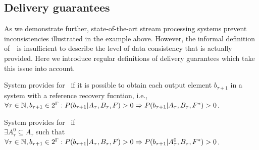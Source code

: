 

\subsection{Delivery guarantees}

As we demonstrate further, state-of-the-art stream processing systems prevent inconsistencies illustrated in the example above. However, the informal definition of~\eo\ is insufficient to describe the level of data consistency that is actually provided. Here we introduce regular definitions of delivery guarantees which take this issue into account. 

\begin{definition}{System provides for~\eo}
if it is possible to obtain each output element $b_{\tau+1}$ in a system with a reference recovery fucntion, i.e.,\\ 
$\forall{\tau \in \mathbb{N}}, b_{\tau+1}\in 2^{\Gamma}: P(b_{\tau+1}|A_{\tau},B_\tau,F)>0 \Rightarrow \\ P(b_{\tau+1}|A_{\tau},B_\tau,F^{*})>0$.
\end{definition}

\begin{definition}{System provides for~\amo}
if \\
$\exists{A^{0}_{\tau}\subseteq{A_{\tau}}}$ such that \\
$\forall{\tau \in \mathbb{N},{b_{\tau+1}\in 2^{\Gamma}}}: P(b_{\tau+1}|A_{\tau},B_\tau,F)>0 \Rightarrow \\ P(b_{\tau+1}|A^{0}_{\tau},B_\tau,F^{*})>0$.
\end{definition}

